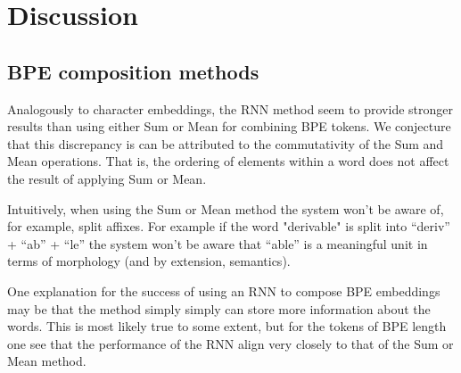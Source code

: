 \documentclass[11pt]{article}
\newcommand\jp[1]{(\textbf{JP:} #1)}
\begin{document}
\begin{figure}
	\end{figure}

	
	
	\section{Discussion}

    \subsection{BPE composition methods}
     Analogously to character embeddings, the RNN method seem
     to provide stronger results than using either Sum or Mean for
     combining BPE tokens. We conjecture that this discrepancy is can
     be attributed to the commutativity of the Sum and Mean
     operations. That is, the ordering of elements within a word does
     not affect the result of applying Sum or Mean.

     Intuitively, when using the Sum or Mean method the system won't
     be aware of, for example, split affixes. For example if the word
     "derivable" is split into ``deriv'' + ``ab'' + ``le'' the system
     won't be aware that ``able'' is a meaningful unit in terms of
     morphology (and by extension, semantics).

     One explanation for the success of using an RNN to compose BPE
     embeddings may be that the method simply simply can store more
     information about the words. This is most likely true to some
     extent, but for the tokens of BPE length one see that the
     performance of the RNN align very closely to that of the Sum or
     Mean method.
\end{document}
